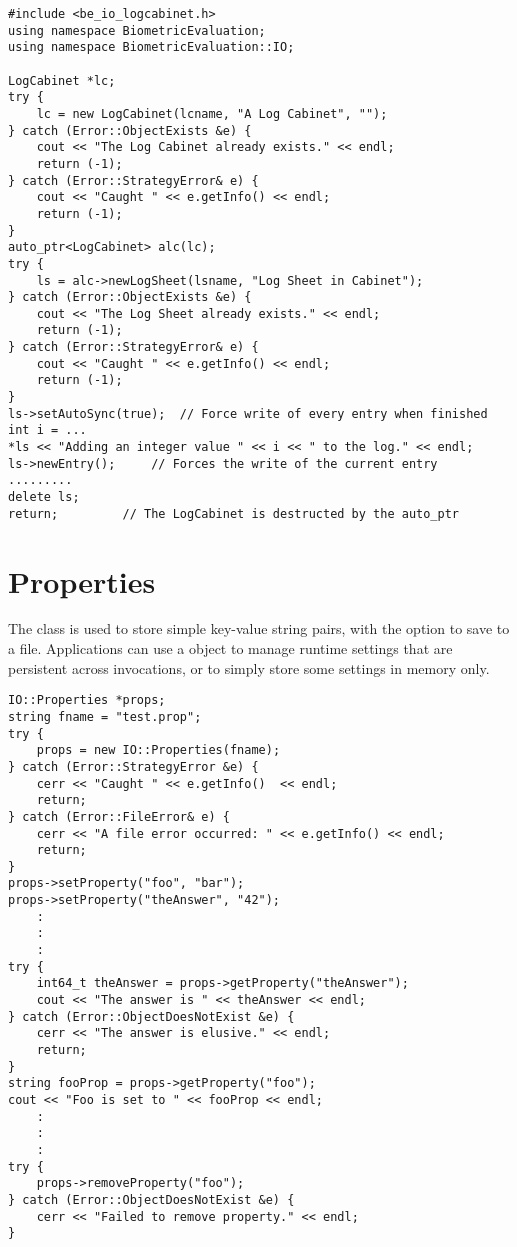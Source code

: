\begin{lstlisting}[caption={Using a \class{LogSheet} within a \class{LogCabinet}}, label=logcabinetuse]
#include <be_io_logcabinet.h>
using namespace BiometricEvaluation;
using namespace BiometricEvaluation::IO;

LogCabinet *lc;
try {
    lc = new LogCabinet(lcname, "A Log Cabinet", "");
} catch (Error::ObjectExists &e) {
    cout << "The Log Cabinet already exists." << endl;
    return (-1);
} catch (Error::StrategyError& e) {
    cout << "Caught " << e.getInfo() << endl;
    return (-1);
}
auto_ptr<LogCabinet> alc(lc);
try {
    ls = alc->newLogSheet(lsname, "Log Sheet in Cabinet");
} catch (Error::ObjectExists &e) {
    cout << "The Log Sheet already exists." << endl;
    return (-1);
} catch (Error::StrategyError& e) {
    cout << "Caught " << e.getInfo() << endl;
    return (-1);
}
ls->setAutoSync(true);	// Force write of every entry when finished
int i = ...
*ls << "Adding an integer value " << i << " to the log." << endl;
ls->newEntry();		// Forces the write of the current entry
.........
delete ls;
return;			// The LogCabinet is destructed by the auto_ptr
\end{lstlisting}

\section{Properties}
\label{sec-properties}
The  class is used to store simple key-value string pairs, with the
option to save to a file. Applications can use a  object to manage
runtime settings that are persistent across invocations, or to simply store
some settings in memory only.

\begin{lstlisting}[caption={Using a \class{Properties} Object}, label=propertiesuse]
IO::Properties *props;
string fname = "test.prop";
try {
    props = new IO::Properties(fname);
} catch (Error::StrategyError &e) {
    cerr << "Caught " << e.getInfo()  << endl;
    return;
} catch (Error::FileError& e) {
    cerr << "A file error occurred: " << e.getInfo() << endl;
    return;
}
props->setProperty("foo", "bar");
props->setProperty("theAnswer", "42");
    :
    :
    :
try {
    int64_t theAnswer = props->getProperty("theAnswer");
    cout << "The answer is " << theAnswer << endl;
} catch (Error::ObjectDoesNotExist &e) {
    cerr << "The answer is elusive." << endl;
    return;
}
string fooProp = props->getProperty("foo");
cout << "Foo is set to " << fooProp << endl;
    :
    :
    :
try {
    props->removeProperty("foo");
} catch (Error::ObjectDoesNotExist &e) {
    cerr << "Failed to remove property." << endl;
}
\end{lstlisting}
